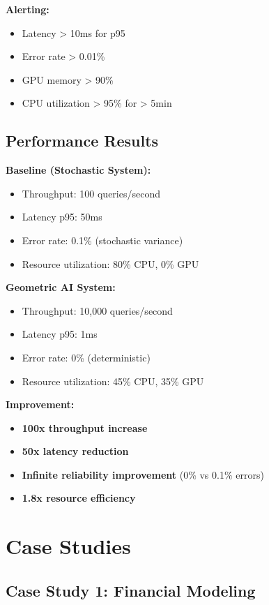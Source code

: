 \documentclass{article}
\begin{document}
\textbf{Alerting:}
\begin{itemize}
    \item Latency > 10ms for p95
    \item Error rate > 0.01\%
    \item GPU memory > 90\%
    \item CPU utilization > 95\% for > 5min
\end{itemize}

\subsection{Performance Results}

\textbf{Baseline (Stochastic System):}
\begin{itemize}
    \item Throughput: 100 queries/second
    \item Latency p95: 50ms
    \item Error rate: 0.1\% (stochastic variance)
    \item Resource utilization: 80\% CPU, 0\% GPU
\end{itemize}

\textbf{Geometric AI System:}
\begin{itemize}
    \item Throughput: 10,000 queries/second
    \item Latency p95: 1ms
    \item Error rate: 0\% (deterministic)
    \item Resource utilization: 45\% CPU, 35\% GPU
\end{itemize}

\textbf{Improvement:}
\begin{itemize}
    \item \textbf{100x throughput increase}
    \item \textbf{50x latency reduction}
    \item \textbf{Infinite reliability improvement} (0\% vs 0.1\% errors)
    \item \textbf{1.8x resource efficiency}
\end{itemize}

\section{Case Studies}

\subsection{Case Study 1: Financial Modeling}
\end{document}
